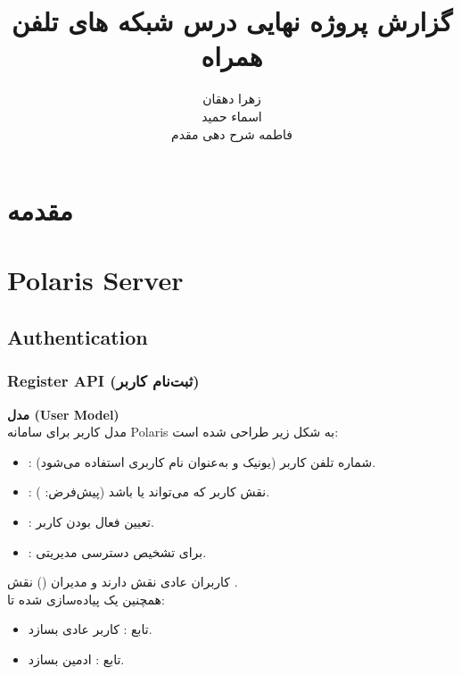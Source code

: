 \documentclass{report}
\title{گزارش پروژه نهایی درس شبکه های تلفن همراه}
\author{زهرا دهقان\\اسماء حمید\\فاطمه شرح دهی مقدم}
\begin{document}
\Godpage
\maketitle
{}
\tableofcontents


\chapter{مقدمه}








\chapter{ }

\chapter{Polaris Server}
\section{Authentication}

\subsection{Register API (ثبت‌نام کاربر)}
\textbf{مدل (User Model)} \\
مدل کاربر برای سامانه Polaris به شکل زیر طراحی شده است:

\begin{itemize}
  \item {}: شماره تلفن کاربر (یونیک و به‌عنوان نام کاربری استفاده می‌شود).
  \item {}: نقش کاربر که می‌تواند  یا  باشد (پیش‌فرض: ).
  \item {}: تعیین فعال بودن کاربر.
  \item {}: برای تشخیص دسترسی مدیریتی.
\end{itemize}

کاربران عادی نقش  دارند و مدیران () نقش . \\
همچنین یک  پیاده‌سازی شده تا:
\begin{itemize}
  \item تابع : کاربر عادی بسازد.
  \item تابع : ادمین بسازد.
\end{itemize}
\end{document}
